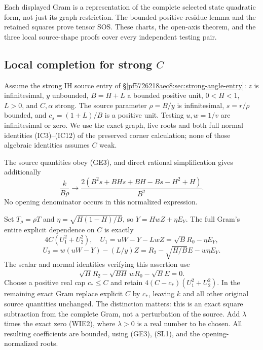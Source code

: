Each displayed Gram is a representation of the complete selected
state quadratic form, not just its graph restriction. The bounded
positive-residue lemma and the retained squares prove tensor SOS.
These charts, the open-axis theorem, and the three local source-shape
proofs cover every independent testing pair.

\subsection{Local completion for strong $C$}
\label{component:pf3e0ca8bf054}

\label{pf3e0ca8bf054:sec:strong-ih-local}
Assume the strong IH source entry of \S\ref{pf5726218aec8:sec:strong-angle-entry}:
$z$ is infinitesimal, $y$ unbounded, $B=H+L$ a bounded positive unit,
$0<H<1$, $L>0$, and $C,\alpha$ strong. The source parameter
$\rho=B/y$ is infinitesimal, $s=r/\rho$ bounded, and $c_s=(1+L)/B$
is a positive unit. Testing $u,w=1/v$ are infinitesimal or zero.
We use the exact graph, five roots and both full normal identities
(IC3)--(IC12) of the preserved corner calculation; none of those
algebraic identities assumes $C$ weak.

The source quantities obey (GE3), and direct rational simplification
gives additionally
\[
 \frac{k}{B\rho}\longrightarrow
 \frac{2(B^2s+BHs+BH-Bs-H^2+H)}{B^2}.
\tag{SL1}
\]
No opening denominator occurs in this normalized expression.

Set $T_\rho=\rho T$ and
$\eta=\sqrt{H(1-H)/B}$, so $Y=HwZ+\eta E_Y$.
The full Gram's entire explicit dependence on $C$ is exactly
\[
 4C(U_1^2+U_2^2),\quad
 U_1=uW-Y-LwZ=\sqrt B R_0-\eta E_Y,
\]
\[
 U_2=w(uW-Y)-(L/y)Z
       =R_2-\sqrt{H/B}E-w\eta E_Y.
\tag{SL2}
\]
The scalar and normal identities verifying this assertion use
\[
 \sqrt H R_2-\sqrt{BH}\,wR_0-\sqrt B E=0.
\tag{SL3}
\]
Choose a positive real cap $c_*\le C$ and retain
$4(C-c_*)(U_1^2+U_2^2)$. In the remaining exact Gram replace explicit
$C$ by $c_*$, leaving $k$ and all other original source quantities
unchanged. The distinction matters: this is an exact square
subtraction from the complete Gram, not a perturbation of the source.
Add $\lambda$ times the exact zero (WIE2), where $\lambda>0$ is a
real number to be chosen. All resulting coefficients are bounded,
using (GE3), (SL1), and the opening-normalized roots.

